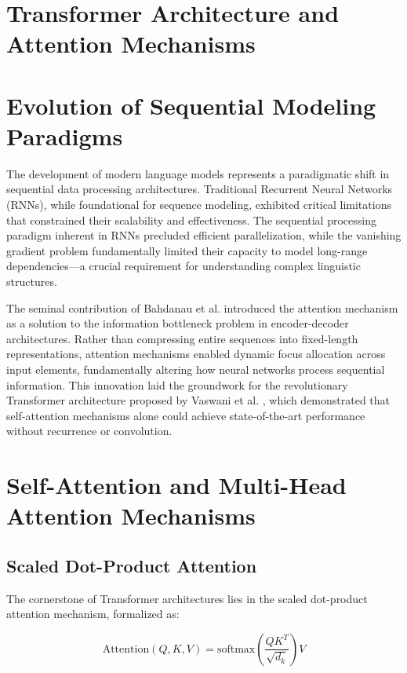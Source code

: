 \section*{Transformer Architecture and Attention Mechanisms}

\section{Evolution of Sequential Modeling Paradigms}

The development of modern language models represents a paradigmatic shift in sequential data processing architectures. Traditional Recurrent Neural Networks (RNNs), while foundational for sequence modeling, exhibited critical limitations that constrained their scalability and effectiveness. The sequential processing paradigm inherent in RNNs precluded efficient parallelization, while the vanishing gradient problem fundamentally limited their capacity to model long-range dependencies—a crucial requirement for understanding complex linguistic structures.

The seminal contribution of Bahdanau et al. \cite{bahdanau2014neural} introduced the attention mechanism as a solution to the information bottleneck problem in encoder-decoder architectures. Rather than compressing entire sequences into fixed-length representations, attention mechanisms enabled dynamic focus allocation across input elements, fundamentally altering how neural networks process sequential information. This innovation laid the groundwork for the revolutionary Transformer architecture proposed by Vaswani et al. \cite{vaswani2017attention}, which demonstrated that self-attention mechanisms alone could achieve state-of-the-art performance without recurrence or convolution.

\section{Self-Attention and Multi-Head Attention Mechanisms}

\subsection{Scaled Dot-Product Attention}

The cornerstone of Transformer architectures lies in the scaled dot-product attention mechanism, formalized as:

\begin{equation}
\text{Attention}(Q, K, V) = \text{softmax}\left(\frac{QK^T}{\sqrt{d_k}}\right)V
\end{equation}


